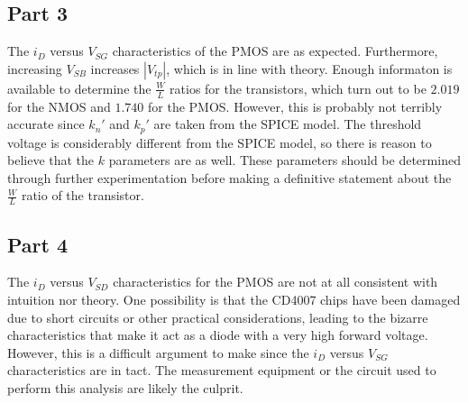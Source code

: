 \subsection{Part 3}
The $i_{D}$ versus $V_{SG}$ characteristics of the PMOS are as expected.
Furthermore, increasing $V_{SB}$ increases $|V_{tp}|$, which is in line with theory.
Enough informaton is available to determine the $\frac{W}{L}$ ratios for the transistors, which turn out to be $2.019$ for the NMOS and $1.740$ for the PMOS.
However, this is probably not terribly accurate since $k_{n}'$ and $k_{p}'$ are taken from the SPICE model.
The threshold voltage is considerably different from the SPICE model, so there is reason to believe that the $k$ parameters are as well.
These parameters should be determined through further experimentation before making a definitive statement about the $\frac{W}{L}$ ratio of the transistor.
\subsection{Part 4}
The $i_{D}$ versus $V_{SD}$ characteristics for the PMOS are not at all consistent with intuition nor theory.
One possibility is that the CD4007 chips have been damaged due to short circuits or other practical considerations, leading to the bizarre characteristics that make it act as a diode with a very high forward voltage.
However, this is a difficult argument to make since the $i_{D}$ versus $V_{SG}$ characteristics are in tact.
The measurement equipment or the circuit used to perform this analysis are likely the culprit.
